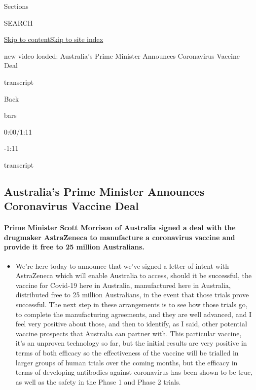 Sections

SEARCH

\protect\hyperlink{site-content}{Skip to
content}\protect\hyperlink{site-index}{Skip to site index}

new video loaded: Australia's Prime Minister Announces Coronavirus
Vaccine Deal

transcript

Back

bars

0:00/1:11

-1:11

transcript

\hypertarget{australias-prime-minister-announces-coronavirus-vaccine-deal}{%
\subsection{Australia's Prime Minister Announces Coronavirus Vaccine
Deal}\label{australias-prime-minister-announces-coronavirus-vaccine-deal}}

\hypertarget{prime-minister-scott-morrison-of-australia-signed-a-deal-with-the-drugmaker-astrazeneca-to-manufacture-a-coronavirus-vaccine-and-provide-it-free-to-25-million-australians}{%
\paragraph{Prime Minister Scott Morrison of Australia signed a deal with
the drugmaker AstraZeneca to manufacture a coronavirus vaccine and
provide it free to 25 million
Australians.}\label{prime-minister-scott-morrison-of-australia-signed-a-deal-with-the-drugmaker-astrazeneca-to-manufacture-a-coronavirus-vaccine-and-provide-it-free-to-25-million-australians}}

\begin{itemize}
\tightlist
\item
  We're here today to announce that we've signed a letter of intent with
  AstraZeneca which will enable Australia to access, should it be
  successful, the vaccine for Covid-19 here in Australia, manufactured
  here in Australia, distributed free to 25 million Australians, in the
  event that those trials prove successful. The next step in these
  arrangements is to see how those trials go, to complete the
  manufacturing agreements, and they are well advanced, and I feel very
  positive about those, and then to identify, as I said, other potential
  vaccine prospects that Australia can partner with. This particular
  vaccine, it's an unproven technology so far, but the initial results
  are very positive in terms of both efficacy so the effectiveness of
  the vaccine will be trialled in larger groups of human trials over the
  coming months, but the efficacy in terms of developing antibodies
  against coronavirus has been shown to be true, as well as the safety
  in the Phase 1 and Phase 2 trials.
\end{itemize}

